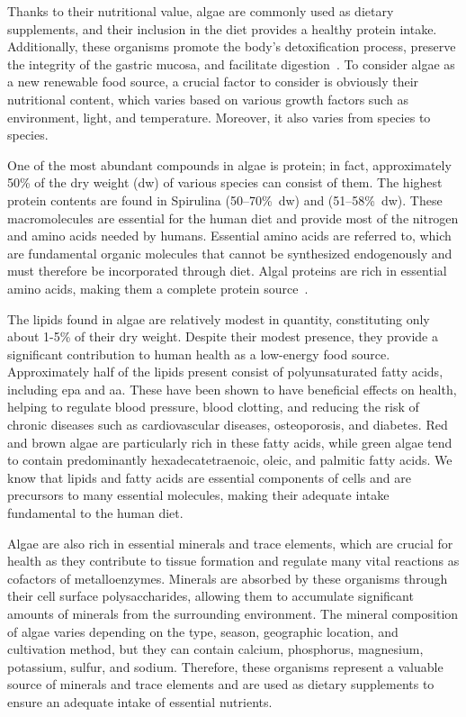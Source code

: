 Thanks to their nutritional value, algae are commonly used as dietary supplements, and their inclusion in the diet provides a healthy protein intake. Additionally, these organisms promote the body's detoxification process, preserve the integrity of the gastric mucosa, and facilitate digestion~\parencite{scieszka_Algae_2019}. To consider algae as a new renewable food source, a crucial factor to consider is obviously their nutritional content, which varies based on various growth factors such as environment, light, and temperature. Moreover, it also varies from species to species.

One of the most abundant compounds in algae is protein; in fact, approximately \num{50}\% of the dry weight (dw)\zxriv{} of various species can consist of them. The highest protein contents are found in Spirulina (\numrange[range-phrase={--}]{50}{70}\%~dw) and \zxriv{} (\numrange[range-phrase={--}]{51}{58}\%~dw). These macromolecules are essential for the human diet and provide most of the nitrogen and amino acids needed by humans. Essential amino acids are referred to, which are fundamental organic molecules that cannot be synthesized endogenously and must therefore be incorporated through diet. Algal proteins are rich in essential amino acids, making them a complete protein source~\parencite{torres-tiji_Microalgae_2020}.

The lipids found in algae are relatively modest in quantity, constituting only about 1-5\% of their dry weight. Despite their modest presence, they provide a significant contribution to human health as a low-energy food source. Approximately half of the lipids present consist of polyunsaturated fatty acids, including \gls{epa} and \gls{aa}. These have been shown to have beneficial effects on health, helping to regulate blood pressure, blood clotting, and reducing the risk of chronic diseases such as cardiovascular diseases, osteoporosis, and diabetes. Red and brown algae are particularly rich in these fatty acids, while green algae tend to contain predominantly hexadecatetraenoic, oleic, and palmitic fatty acids. We know that lipids and fatty acids are essential components of cells and are precursors to many essential molecules, making their adequate intake fundamental to the human diet.

Algae are also rich in essential minerals and trace elements, which are crucial for health as they contribute to tissue formation and regulate many vital reactions as cofactors of metalloenzymes. Minerals are absorbed by these organisms through their cell surface polysaccharides, allowing them to accumulate significant amounts of minerals from the surrounding environment. The mineral composition of algae varies depending on the type, season, geographic location, and cultivation method, but they can contain calcium, phosphorus, magnesium, potassium, sulfur, and sodium. Therefore, these organisms represent a valuable source of minerals and trace elements and are used as dietary supplements to ensure an adequate intake of essential nutrients.

